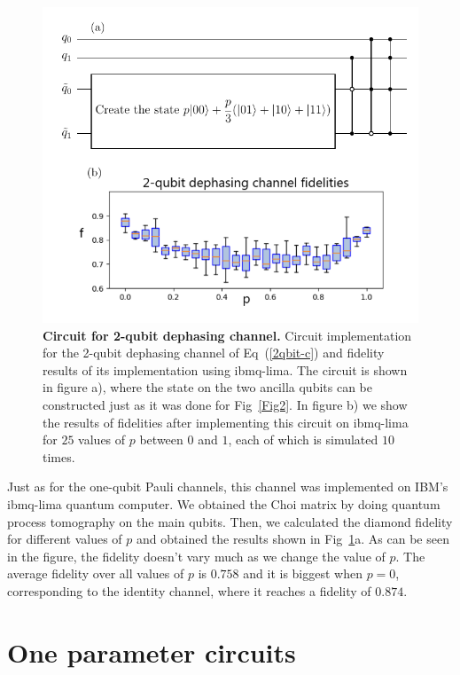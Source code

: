 \documentclass[10pt,letterpaper]{article} %
\newcommand{\fref}[1]{Fig~\ref{#1}}
\newcommand{\eref}[1]{Eq~(\ref{#1})}
\begin{document}
\begin{figure} %
\centering
\includegraphics{qbit-im.pdf}
\caption{{\bf Circuit for 2-qubit dephasing channel.}  Circuit implementation
for the 2-qubit dephasing channel of \eref{2qbit-c} and fidelity results of its implementation using ibmq-lima.
 The circuit is shown in figure a), where the  state on the two
ancilla qubits can be constructed just as it was done for \fref{Fig2}. 
In figure b) we show the results of fidelities after implementing
this circuit on ibmq-lima for $25$ values of $p$ between $0$ and $1$, 
each of which is simulated $10$ times.
}
\label{2qbit}
\end{figure} %

Just as for the one-qubit Pauli channels, this 
channel was implemented on IBM's ibmq-lima  quantum computer. We obtained the Choi 
matrix by doing quantum process tomography on
the main qubits. Then, we calculated the diamond fidelity for different values of $p$ and
obtained the results shown in \fref{2qbit}a. 
As can be seen in the figure, the fidelity doesn't vary much as we change the value of $p$.
The average fidelity over all values of $p$ is $0.758$ and it is biggest when $p=0$,
corresponding to the identity channel, where it reaches a fidelity of $0.874$.

\section{One parameter circuits} %
\label{sec: 1PR Circuits}
\end{document}
